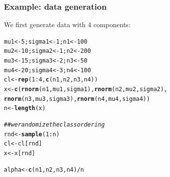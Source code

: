 \documentclass{beamer}\usepackage[]{graphicx}\usepackage[]{color}
\makeatletter
\newcommand{\hlnum}[1]{\textcolor[rgb]{0.686,0.059,0.569}{#1}}%
\newcommand{\hlcom}[1]{\textcolor[rgb]{0.678,0.584,0.686}{\textit{#1}}}%
\newcommand{\hlopt}[1]{\textcolor[rgb]{0,0,0}{#1}}%
\newcommand{\hlstd}[1]{\textcolor[rgb]{0.345,0.345,0.345}{#1}}%
\newcommand{\hlkwb}[1]{\textcolor[rgb]{0.69,0.353,0.396}{#1}}%
\newcommand{\hlkwd}[1]{\textcolor[rgb]{0.737,0.353,0.396}{\textbf{#1}}}%
\newenvironment{kframe}{%
 \def\at@end@of@kframe{}%
 \ifinner\ifhmode%
  \def\at@end@of@kframe{\end{minipage}}%
  \begin{minipage}{\columnwidth}%
 \fi\fi%
 \def\FrameCommand##1{\hskip\@totalleftmargin \hskip-\fboxsep
 \colorbox{shadecolor}{##1}\hskip-\fboxsep
     \hskip-\linewidth \hskip-\@totalleftmargin \hskip\columnwidth}%
 \MakeFramed {\advance\hsize-\width
   \@totalleftmargin\z@ \linewidth\hsize
   \@setminipage}}%
 {\par\unskip\endMakeFramed%
 \at@end@of@kframe}
\newenvironment{knitrout}{}{} %
\makeatother
\begin{document}
\begin{frame}[fragile]
  \frametitle{Example: data generation}

We first generate data with 4 components:
\begin{knitrout}\scriptsize
{}\color{fgcolor}\begin{kframe}
\begin{alltt}
\hlstd{mu1} \hlkwb{<-} \hlnum{5}   \hlstd{; sigma1} \hlkwb{<-} \hlnum{1}\hlstd{; n1} \hlkwb{<-} \hlnum{100}
\hlstd{mu2} \hlkwb{<-} \hlnum{10}  \hlstd{; sigma2} \hlkwb{<-} \hlnum{1}\hlstd{; n2} \hlkwb{<-} \hlnum{200}
\hlstd{mu3} \hlkwb{<-} \hlnum{15}  \hlstd{; sigma3} \hlkwb{<-} \hlnum{2}\hlstd{; n3} \hlkwb{<-} \hlnum{50}
\hlstd{mu4} \hlkwb{<-} \hlnum{20}  \hlstd{; sigma4} \hlkwb{<-} \hlnum{3}\hlstd{; n4} \hlkwb{<-} \hlnum{100}
\hlstd{cl} \hlkwb{<-} \hlkwd{rep}\hlstd{(}\hlnum{1}\hlopt{:}\hlnum{4}\hlstd{,}\hlkwd{c}\hlstd{(n1,n2,n3,n4))}
\hlstd{x} \hlkwb{<-} \hlkwd{c}\hlstd{(}\hlkwd{rnorm}\hlstd{(n1,mu1,sigma1),}\hlkwd{rnorm}\hlstd{(n2,mu2,sigma2),}
       \hlkwd{rnorm}\hlstd{(n3,mu3,sigma3),}\hlkwd{rnorm}\hlstd{(n4,mu4,sigma4))}
\hlstd{n} \hlkwb{<-} \hlkwd{length}\hlstd{(x)}

\hlcom{## we randomize the class ordering}
\hlstd{rnd} \hlkwb{<-} \hlkwd{sample}\hlstd{(}\hlnum{1}\hlopt{:}\hlstd{n)}
\hlstd{cl} \hlkwb{<-} \hlstd{cl[rnd]}
\hlstd{x}  \hlkwb{<-} \hlstd{x[rnd]}

\hlstd{alpha} \hlkwb{<-} \hlkwd{c}\hlstd{(n1,n2,n3,n4)}\hlopt{/}\hlstd{n}
\end{alltt}
\end{kframe}
\end{knitrout}
\end{frame}
\end{document}
